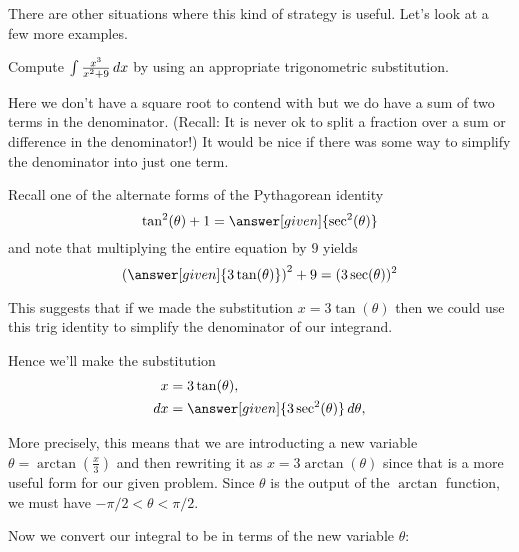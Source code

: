 \documentclass{ximera}
\begin{document}
There are other situations where this kind of strategy is useful. Let's look at a few more examples.

\begin{example}
  Compute $\int \frac{x^3}{x^2+9} \mathop{}\!d x$ by using an appropriate trigonometric substitution.
  
  \begin{explanation}
Here we don't have a square root to contend with but we do have a sum of two 
terms in the denominator. (Recall: It is never ok to split a fraction over a sum or difference in the denominator!)   It would be nice if there was some way to simplify the denominator into just one term. 

   Recall one of the alternate forms of the Pythagorean identity
    \[
    \tan^2(\theta) + 1 = \answer[given]{\sec^2(\theta)}
    \]
    and note that multiplying the entire equation by $9$ yields
    \[
    \left(\answer[given]{3\tan(\theta)}\right)^2 + 9 = (3\sec(\theta))^2
    \]

This suggests that if we made the substitution $x=3\tan(\theta)$ then we could
use this trig identity to simplify the denominator of our integrand. 

    Hence we'll make the substitution
    \begin{align*}
      x &= 3\tan(\theta),\\
      \d x &= \answer[given]{3\sec^2(\theta)} \d \theta,
    \end{align*}

\begin{remark}
More precisely, this means that we are introducting a new variable $\theta=\arctan\left(\frac{x}{3}\right)$ 
and then rewriting it as $x=3\arctan(\theta)$ since that is a more useful form 
for our given problem. Since $\theta$ is the output of the $\arctan$ function, we must have
$-\pi/2 < \theta < \pi/2$. 
\end{remark}

Now we convert our integral to be in terms of the new variable $\theta$:


\end{explanation}
\end{example}
\end{document}
